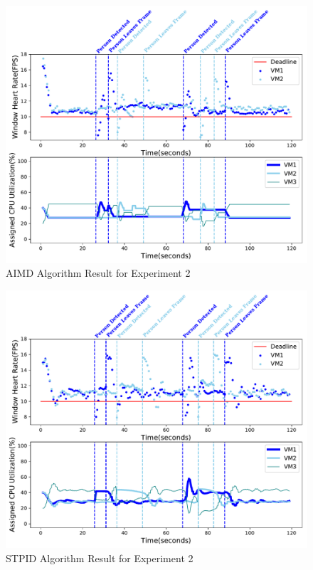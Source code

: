 \begin{figure}[h!]
\centering
\includegraphics[width=1\linewidth]{images/3vm_aimd}
\caption{AIMD Algorithm Result for Experiment 2}
\label{3vm_aimd}
\end{figure}

\begin{figure}[h!]
\centering
\includegraphics[width=1\linewidth]{images/3vm_apid}
\caption{STPID Algorithm Result for Experiment 2}
\label{3vm_apid}
\end{figure}



